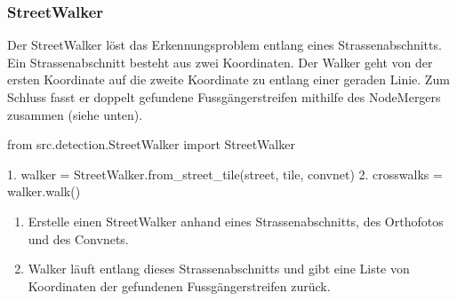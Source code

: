 \subsubsection{StreetWalker}
Der StreetWalker löst das Erkennungsproblem entlang eines Strassenabschnitts. Ein Strassenabschnitt besteht aus zwei Koordinaten. Der Walker geht von der ersten Koordinate auf die zweite Koordinate zu entlang einer geraden Linie. Zum Schluss fasst er doppelt gefundene Fussgängerstreifen mithilfe des NodeMergers zusammen (siehe unten).
\\
\begin{python}
	from src.detection.StreetWalker import StreetWalker
	
	1. walker = StreetWalker.from_street_tile(street, tile, convnet)
	2. crosswalks = walker.walk()
\end{python}
\begin{enumerate}
	\item Erstelle einen StreetWalker anhand eines Strassenabschnitts, des Orthofotos und des Convnets.
	\item Walker läuft entlang dieses Strassenabschnitts und gibt eine Liste von Koordinaten der gefundenen Fussgängerstreifen zurück.
\end{enumerate}

